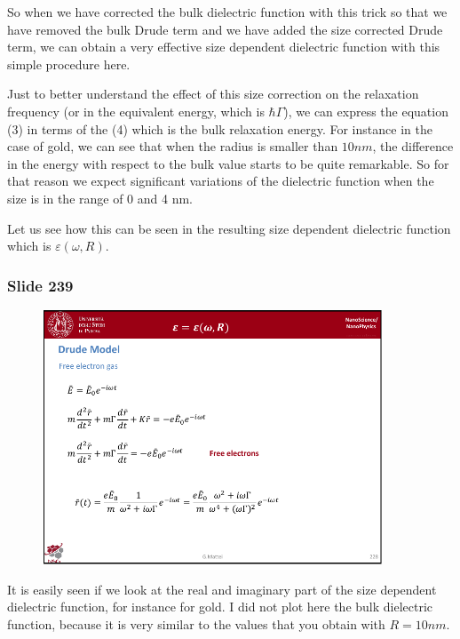 \documentclass[../main/main.tex]{subfiles}
\begin{document}
So when we have corrected the bulk dielectric function with this trick so that we have removed the bulk Drude term and we have added the size corrected Drude term, we can obtain a very effective size dependent dielectric function with this simple procedure here.

Just to better understand the effect of this size correction on the relaxation frequency (or in the equivalent energy, which is \( \hbar \Gamma  \)), we can express the equation (3) in terms of the (4) which is the bulk relaxation energy. For instance in the case of gold, we can see that when the radius is smaller than \( 10nm \), the difference in the energy with respect to the bulk value starts to be quite remarkable. So for that reason we expect significant variations of the dielectric function when the size is in the range of 0 and 4 nm.

Let us see how this can be seen in the resulting size dependent dielectric function which is \( \varepsilon (\omega , R) \).


\newpage

\subsubsection{Slide 239}

\begin{figure}[h!]
\centering
\includegraphics[page=12,width=0.9\textwidth]{../lessons/pdf_file/15_lesson.pdf}
\end{figure}

It is easily seen if we look at the real and imaginary part of the size dependent dielectric function, for instance for gold.
I did not plot here the bulk dielectric function, because it is very similar to the values that you obtain with \( R=10nm \).
\end{document}
